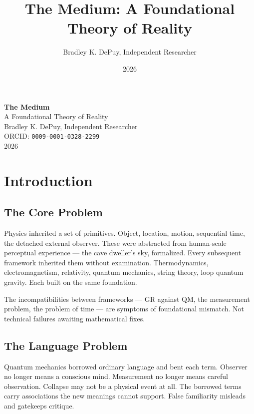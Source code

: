 \documentclass[11pt,letterpaper]{article}
\author{Bradley K. DePuy, Independent Researcher}
\date{2026}
\title{The Medium: A Foundational Theory of Reality}
\begin{document}
\pagestyle{plain}
\begin{titlepage}
\vspace*{4cm}
\begin{center}
  {\LARGE\bfseries The Medium}\\[0.6em]
  {\large A Foundational Theory of Reality}\\[2.5em]
  {\normalsize Bradley K. DePuy, Independent Researcher}\\[0.5em]
  {\normalsize ORCID: \mbox{\texttt{0009-0001-0328-2299}}}\\[0.5em]
  {\normalsize 2026}
\end{center}
\end{titlepage}

\pagestyle{body}

\section{Introduction}
\label{sec:org12bcefa}
\subsection{The Core Problem}
\label{sec:orgbb8e1b1}


Physics inherited a set of primitives. Object, location, motion, sequential time, the detached external observer. These were abstracted from human-scale perceptual experience — the cave dweller's sky, formalized. Every subsequent framework inherited them without examination. Thermodynamics, electromagnetism, relativity, quantum mechanics, string theory, loop quantum gravity. Each built on the same foundation.

The incompatibilities between frameworks — GR against QM, the measurement problem, the problem of time — are symptoms of foundational mismatch. Not technical failures awaiting mathematical fixes.

\subsection{The Language Problem}
\label{sec:org8abf209}


Quantum mechanics borrowed ordinary language and bent each term. Observer no longer means a conscious mind. Measurement no longer means careful observation. Collapse may not be a physical event at all. The borrowed terms carry associations the new meanings cannot support. False familiarity misleads and gatekeeps critique.
\end{document}
